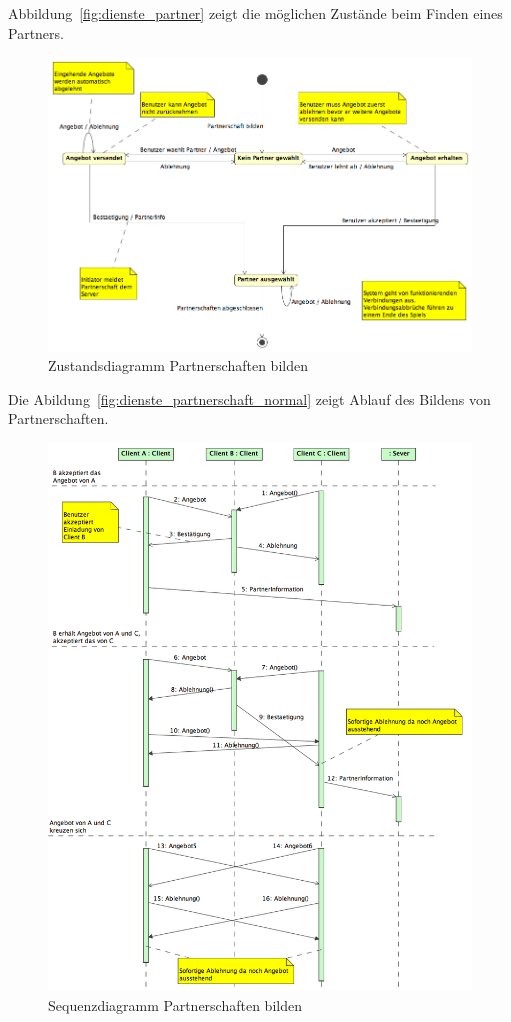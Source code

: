 \documentclass[12pt,halfparskip]{scrartcl}
\begin{document}
Abbildung~\vref{fig:dienste_partner} zeigt die möglichen Zustände beim Finden eines Partners.
\begin{figure}[h]
	\centering
	\includegraphics[width=\textwidth]{dienste_partner}
	\caption{Zustandsdiagramm Partnerschaften bilden}
	\label{fig:dienste_partner}
\end{figure}

Die Abildung~\vref{fig:dienste_partnerschaft_normal} zeigt Ablauf des Bildens von Partnerschaften.
\begin{figure}[h]
	\centering
	\includegraphics[width=\textwidth]{dienste_partnerschaft_normal}
	\caption{Sequenzdiagramm Partnerschaften bilden}
	\label{fig:dienste_partnerschaft_normal}
\end{figure}
\end{document}
